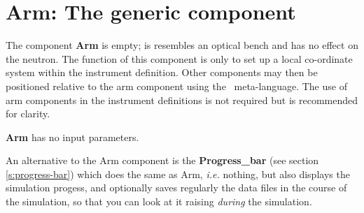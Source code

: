 \section{Arm: The generic component}
\label{explain:arm}

The component {\bf Arm} is empty; is resembles an optical bench
and has no effect on the neutron.
The function of this component is only to set up a local
co-ordinate system within the instrument definition.
Other components may then be
positioned relative to the arm component
using the \MCS\ meta-language.
The use of arm components in the instrument definitions
is not required but is recommended for clarity.

{\bf Arm} has no input parameters.

An alternative to the Arm component is the {\bf Progress\_bar} (see section \ref{s:progress-bar}) which does the same as Arm, {\it i.e.} nothing, but also displays the simulation progess, and optionally saves regularly the data files in the course of the simulation, so that you can look at it raising \emph{during} the simulation.

